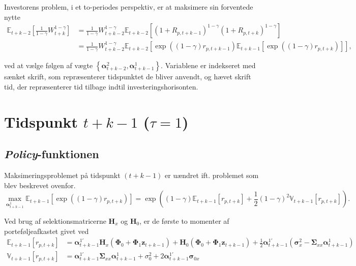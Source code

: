 \documentclass[
  a4paper,
  oneside]{memoir}
\begin{document}
Investorens problem, i et to-periodes perspektiv, er at maksimere sin forventede nytte
\begin{align*}
\mathbb{E}_{t+k-2}\left[\frac{1}{1-\gamma} W_{t+k}^{1-\gamma}\right]&=\frac{1}{1-\gamma} W_{t+k-2}^{1-\gamma} \mathbb{E}_{t+k-2}\left[(1+R_{p,t+k-1})^{1-\gamma}(1+R_{p,t+k})^{1-\gamma}\right]\\
&=\frac{1}{1-\gamma} W_{t+k-2}^{1-\gamma} \mathbb{E}_{t+k-2}\left[\exp((1-\gamma) r_{p,t+k-1}) \mathbb{E}_{t+k-1}\left[\exp((1-\gamma)r_{p,t+k})\right]\right],
\end{align*}

ved at vælge følgen af vægte \(\left\{\bm{\alpha}_{t+k-2}^2, \bm{\alpha}_{t+k-1}^1\right\}\). Variablene er indekseret med sænket skrift, som repræsenterer tidspunktet de bliver anvendt, og hævet skrift tid, der repræsenterer tid tilbage indtil investeringshorisonten.

\hypertarget{tidspunkt-tk-1-tau1}{%
\section{\texorpdfstring{Tidspunkt \(t+k-1\) (\(\tau=1\))}{Tidspunkt t+k-1 (\textbackslash tau=1)}}\label{tidspunkt-tk-1-tau1}}

\hypertarget{policy-funktionen}{%
\subsection{\texorpdfstring{\emph{Policy}-funktionen}{Policy-funktionen}}\label{policy-funktionen}}

Maksimeringsproblemet på tidspunkt \((t+k-1)\) er uændret ift. problemet som blev beskrevet ovenfor.
\[\max_{\bm{\alpha}_{t+k-1}^1} \mathbb{E}_{t+k-1}\left[\exp((1-\gamma)r_{p,t+k})\right] = \exp\left((1-\gamma) \mathbb{E}_{t+k-1}\left[r_{p,t+k}\right]+\frac{1}{2}(1-\gamma)^2 \mathbb{V}_{t+k-1}\left[r_{p,t+k}\right]\right).\]

Ved brug af selektionsmatricerne \(\bm{H}_x\) og \(\bm{H}_0\), er de første to momenter af porteføljeafkastet givet ved
\begin{align*}
\mathbb{E}_{t+k-1}\left[r_{p,t+k}\right]&= \bm{\alpha}_{t+k-1}^{1\prime} \bm{H}_x (\bm{\Phi}_0 +\bm{\Phi}_1\bm{z}_{t+k-1}) + \bm{H}_0(\bm{\Phi}_0 +\bm{\Phi}_1\bm{z}_{t+k-1})+\frac{1}{2} \bm{\alpha}_{t+k-1}^{1\prime} \left(\bm{\sigma}_x^2-\bm{\Sigma}_{xx}\bm{\alpha}_{t+k-1}^{1}\right)\\
\mathbb{V}_{t+k-1}[r_{p,t+k}]&=\bm{\alpha}_{t+k-1}^{1\prime}\bm{\Sigma}_{xx}\bm{\alpha}_{t+k-1}^{1}+ \sigma_0^2 + 2\bm{\alpha}_{t+k-1}^{1\prime}\bm{\sigma}_{0x}
\end{align*}
\end{document}
